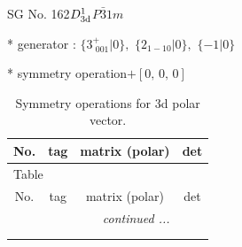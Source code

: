 \documentclass[fleqn,8pt]{jsarticle}
\begin{document}
\setcounter{MaxMatrixCols}{32}

\renewcommand{\tablename}{Table~}
\renewcommand{\figurename}{Figure~}
\begin{center}
\LARGE
SG No. 162\quad$D_{\rm 3d}^{1}$\quad$P\bar{3}1m$\quad[ trigonal ]
\end{center}

* generator : $\{3^{+}_{\,\,001}|0\},\,\,\{2{}_{1-10}|0\},\,\,\{-1|0\}$

* symmetry operation\quad$+\left[ 0,\, 0,\, 0 \right]$
\renewcommand{\arraystretch}{1.3}
\begin{longtable}{cccc}
\caption{Symmetry operations for 3d polar vector.}
 \\
 \hline \hline
No. & tag & matrix (polar) & det \\ \hline \endfirsthead

\multicolumn{3}{l}{\tablename\ \thetable{}} \\
 \hline \hline
No. & tag & matrix (polar) & det \\ \hline \endhead

 \hline \hline
\multicolumn{3}{r}{\footnotesize\it continued ...} \\ \endfoot

 \hline \hline
\multicolumn{3}{r}{} \\ \endlastfoot


\end{longtable}
\end{document}
